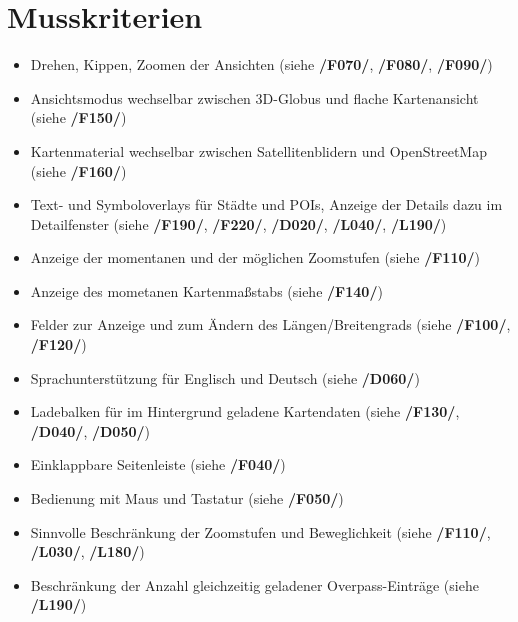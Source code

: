 \documentclass[10pt]{scrreprt}
\begin{document}
\section{Musskriterien}
\begin{itemize}
\item Drehen, Kippen, Zoomen der Ansichten (siehe \textbf{/F070/}, \textbf{/F080/}, \textbf{/F090/})
\item Ansichtsmodus wechselbar zwischen 3D-Globus und flache Kartenansicht (siehe \textbf{/F150/})
\item Kartenmaterial wechselbar zwischen Satellitenblidern und OpenStreetMap (siehe \textbf{/F160/})
\item Text- und Symboloverlays für Städte und POIs, Anzeige der Details dazu im Detailfenster (siehe \textbf{/F190/}, \textbf{/F220/}, \textbf{/D020/}, \textbf{/L040/}, \textbf{/L190/})
\item Anzeige der momentanen und der möglichen Zoomstufen (siehe \textbf{/F110/})
\item Anzeige des mometanen Kartenmaßstabs  (siehe \textbf{/F140/})
\item Felder zur Anzeige und zum Ändern des Längen/Breitengrads (siehe \textbf{/F100/}, \textbf{/F120/})
\item Sprachunterstützung für Englisch und Deutsch (siehe \textbf{/D060/})
\item Ladebalken für im Hintergrund geladene Kartendaten (siehe \textbf{/F130/}, \textbf{/D040/}, \textbf{/D050/})
\item Einklappbare Seitenleiste (siehe \textbf{/F040/})
\item Bedienung mit Maus und Tastatur (siehe \textbf{/F050/})
\item Sinnvolle Beschränkung der Zoomstufen und Beweglichkeit (siehe \textbf{/F110/}, \textbf{/L030/}, \textbf{/L180/})
\item Beschränkung der Anzahl gleichzeitig geladener Overpass-Einträge (siehe \textbf{/L190/})
\end{itemize}
\end{document}
